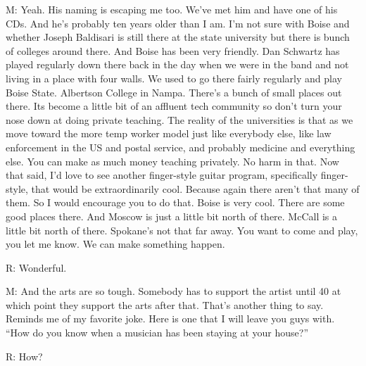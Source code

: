 \documentclass[11pt]{article}
\begin{document}
M: Yeah. His naming is escaping me too. We've met him and have one of
his CDs. And he's probably ten years older than I am. I'm not sure
with Boise and whether Joseph Baldisari is still there at the state
university but there is bunch of colleges around there. And Boise has
been very friendly. Dan Schwartz has played regularly down there back
in the day when we were in the band and not living in a place with
four walls. We used to go there fairly regularly and play Boise
State. Albertson College in Nampa. There's a bunch of small places out
there. Its become a little bit of an affluent tech community so don't
turn your nose down at doing private teaching. The reality of the universities is that as we move toward the more temp worker model just like everybody else, like law enforcement in the US and postal service, and probably medicine and everything else. You can make as much money teaching privately. No harm in that. Now that said, I'd love to see another finger-style guitar program, specifically finger-style, that would be extraordinarily cool. Because again there aren't that many of them. So I would encourage you to do that. Boise is very cool. There are some good places there. And Moscow is just a little bit north of there. McCall is a little bit north of there. Spokane's not that far away. You want to come and play, you let me know. We can make something happen.

R: Wonderful.

M: And the arts are so tough. Somebody has to support the artist until 40 at which point they support the arts after that. That's another thing to say. Reminds me of my favorite joke. Here is one that I will leave you guys with. ``How do you know when a musician has been staying at your house?'' 

R: How?
\end{document}
